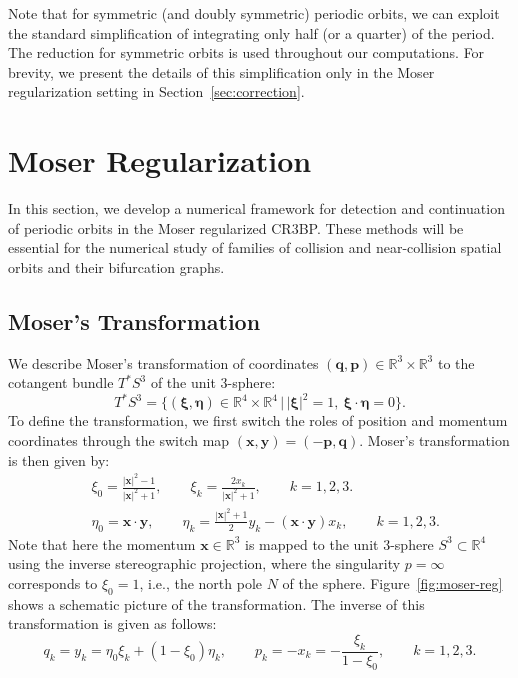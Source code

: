 \documentclass[pdflatex,sn-mathphys-ay]{sn-jnl}%
\theoremstyle{thmstyleone}%
\theoremstyle{thmstyletwo}%
\theoremstyle{thmstylethree}%
\begin{document}
Note that for symmetric (and doubly symmetric) periodic orbits, we can exploit the standard simplification of integrating only half (or a quarter) of the period. The reduction for symmetric orbits is used throughout our computations. For brevity, we present the details of this simplification only in the Moser regularization setting in Section~\ref{sec:correction}.

\section{Moser Regularization}
\label{sec:moser}
In this section, we develop a numerical framework for detection and continuation of periodic orbits in the Moser regularized CR3BP. 
These methods will be essential for the numerical study of families of collision and near-collision spatial orbits and their bifurcation graphs.

\subsection{Moser's Transformation}
We describe Moser's transformation of coordinates $(\mathbf{q}, \mathbf{p})\in \mathbb{R}^3\times \mathbb{R}^3$ to the cotangent bundle $T^*S^3$ of the unit $3$-sphere:
\[
    T^*S^3 = \{(\boldsymbol{\xi}, \boldsymbol{\eta}) \in \mathbb{R}^4 \times \mathbb{R}^4 \, | \, |\boldsymbol{\xi}|^2 = 1,\ \boldsymbol{\xi}\cdot \boldsymbol{\eta} = 0 \}.
\] 
To define the transformation, we first switch the roles of position and momentum coordinates through the switch map $(\mathbf{x}, \mathbf{y}) = (-\mathbf{p}, \mathbf{q})$. 
Moser's transformation is then given by:
\begin{equation}
\label{eqn:moser_transf}
\begin{aligned}
&\xi_0 = \frac{|\mathbf{x}|^2 - 1}{|\mathbf{x}|^2 + 1},
\qquad
\xi_k = \frac{2x_k}{|\mathbf{x}|^2 + 1},
\qquad
k=1,2,3.
\\
&\eta_0 = \mathbf{x} \cdot \mathbf{y},
\qquad
\eta_k = \frac{|\mathbf{x}|^2+1}{2} y_k -(\mathbf{x} \cdot \mathbf{y}) x_k,
\qquad
k=1,2,3.
\end{aligned}
\end{equation}
Note that here the momentum $\mathbf{x}\in \mathbb{R}^3$ is mapped to the unit $3$-sphere $S^3\subset\mathbb{R}^4$ using the inverse stereographic projection, where the singularity $p=\infty$ corresponds to $\xi_0 = 1$, i.e., the north pole $N$ of the sphere.
Figure~\ref{fig:moser-reg} shows a schematic picture of the transformation.
The inverse of this transformation is given as follows: 
\[ 
q_k = y_k = \eta_0 \xi_k + (1 - \xi_0)\eta_k, 
\qquad p_k = -x_k = -\frac{\xi_k}{1 - \xi_0}, 
\qquad k=1,2,3. 
\]
\end{document}

